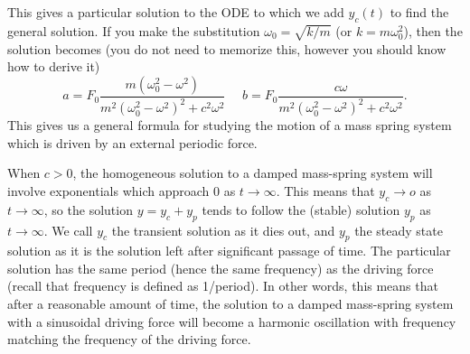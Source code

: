 This gives a particular solution to the ODE to which we add $y_c(t)$ to find the general solution. If you make the substitution $\omega_0=\sqrt{k/m}$ (or $k=m\omega_0^2$), then the solution becomes (you do not need to memorize this, however you should know how to derive it)
$$a=F_0\frac{m(\omega_0^2-\omega^2)}{m^2(\omega_0^2-\omega^2)^2+c^2\omega^2}\ \ \ \ \ \ b=F_0\frac{c\omega}{m^2(\omega_0^2-\omega^2)^2+c^2\omega^2}.$$
This gives us a general formula for studying the motion of a mass spring system which is driven by an external periodic force.

\begin{observation}
When $c>0$, the homogeneous solution to a damped mass-spring system will involve exponentials which approach 0 as $t\to \infty$. This means that $y_c\to o$ as $t\to \infty$, so the solution $y=y_c+y_p$ tends to follow the (stable) solution $y_p$ as $t\to\infty$. We call $y_c$ the transient solution as it dies out, and $y_p$ the steady state solution as it is the solution left after significant passage of time. The particular solution has the same period (hence the same frequency) as the driving force (recall that frequency is defined as 1/period). In other words, this means that after a reasonable amount of time, the solution to a damped mass-spring system with a sinusoidal driving force will become a harmonic oscillation with frequency matching the frequency of the driving force.
\end{observation}

